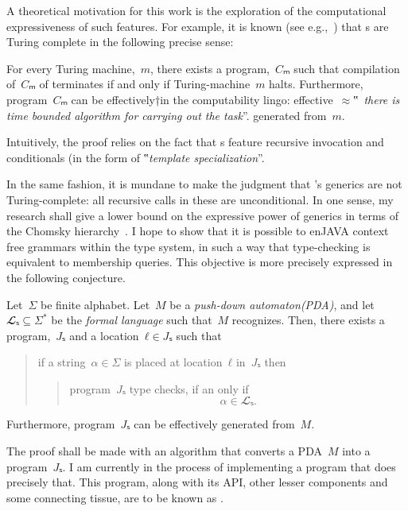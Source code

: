 A theoretical motivation for this work
  is the exploration of the computational
  expressiveness of such features.
For example, it is known (see e.g.,~\cite{Gutterman:2003}) that
  s are Turing complete in the following precise sense:

\begin{Theorem}
  \label{Theorem:Gutterman}
  For every Turing machine,~$m$, there exists a \CC program,~$Cₘ$ such that
    compilation of~$Cₘ$ of terminates if and only if
      Turing-machine~$m$ halts.
  Furthermore, program~$Cₘ$ can be effectively†{in the computability lingo:
    effective~$≈$‟~\emph{there is time
  bounded algorithm for carrying out the task}”.} generated from~$m$.
\end{Theorem}

Intuitively, the proof relies on the fact that s
  feature recursive invocation and conditionals (in the form of
  ‟\emph{template specialization}”.

In the same fashion, it is mundane to make the judgment that
  \Java's generics are not Turing-complete: all recursive calls
  in these are unconditional.
In one sense, my research shall give a lower bound on the
  expressive power of \Java generics in terms of the Chomsky hierarchy~\cite{Chomsky:1963}.
I hope to show that it is possible to enJAVA context free grammars within the \Java type system,
  in such a way that type-checking is equivalent to membership queries.
This objective is more precisely expressed in the following conjecture.

\begin{Theorem}
\label{Theorem:Gil-Levy}
Let~$Σ$ be finite alphabet.
Let~$M$ be a \emph{push-down automaton(PDA)}, and let~$𝓛ₛ⊆Σ^*$ be
the \emph{formal language} such that~$M$ recognizes.
Then, there exists a \Java program,~$Jₛ$ and a location~$ℓ∈Jₛ$
such that
\begin{quote}
  if a string~$α∈Σ$ is
  placed at location~$ℓ$ in~$Jₛ$ then
  \begin{quote}
    program~$Jₛ$ type checks, if an only if
    \[
      α∈𝓛ₛ.
    \]
  \end{quote}
\end{quote}
Furthermore, program~$Jₛ$ can be effectively generated from~$M$.
\end{Theorem}

The proof shall be made with an algorithm that converts a
  PDA~$M$ into a program~$Jₛ$.
I am currently in the process of implementing a program that
  does precisely that.
This program, along with its API, other lesser components and
  some connecting tissue, are to be known as \Self.

